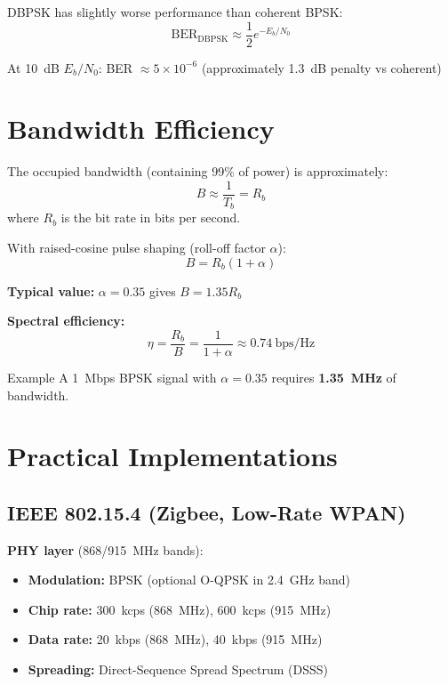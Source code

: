 DBPSK has slightly worse performance than coherent BPSK:
\begin{equation}
\mathrm{BER}_{\mathrm{DBPSK}} \approx \frac{1}{2}e^{-E_b/N_0}
\end{equation}

At 10~dB $E_b/N_0$: BER $\approx 5 \times 10^{-6}$ (approximately 1.3~dB penalty vs coherent)

\section{Bandwidth Efficiency}

The occupied bandwidth (containing 99\% of power) is approximately:
\begin{equation}
B \approx \frac{1}{T_b} = R_b
\end{equation}
where $R_b$ is the bit rate in bits per second.

With raised-cosine pulse shaping (roll-off factor $\alpha$):
\begin{equation}
B = R_b(1 + \alpha)
\end{equation}

\textbf{Typical value:} $\alpha = 0.35$ gives $B = 1.35 R_b$

\textbf{Spectral efficiency:}
\begin{equation}
\eta = \frac{R_b}{B} = \frac{1}{1+\alpha} \approx 0.74\ \text{bps/Hz}
\end{equation}

\begin{calloutbox}{Example}
A 1~Mbps BPSK signal with $\alpha = 0.35$ requires \textbf{1.35~MHz} of bandwidth.
\end{calloutbox}

\section{Practical Implementations}

\subsection{IEEE 802.15.4 (Zigbee, Low-Rate WPAN)}

\textbf{PHY layer} (868/915~MHz bands):
\begin{itemize}
\item \textbf{Modulation:} BPSK (optional O-QPSK in 2.4~GHz band)
\item \textbf{Chip rate:} 300~kcps (868~MHz), 600~kcps (915~MHz)
\item \textbf{Data rate:} 20~kbps (868~MHz), 40~kbps (915~MHz)
\item \textbf{Spreading:} Direct-Sequence Spread Spectrum (DSSS)
\end{itemize}

